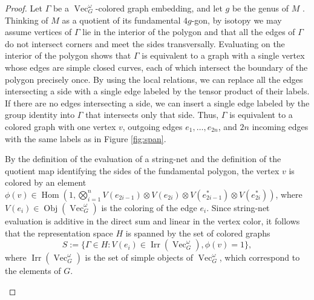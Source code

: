 \documentclass{amsart}
\DeclareMathOperator{\Vect}{Vec}
\DeclareMathOperator{\Hom}{Hom}
\DeclareMathOperator{\Obj}{Obj}
\DeclareMathOperator{\Irr}{Irr}
\begin{document}
\begin{proof}
Let $\Gamma$ be a $\Vect_G^\omega$-colored graph embedding, and let $g$ be the genus of $M$ . Thinking of $M$ as a quotient of its fundamental $4g$-gon, by isotopy we may assume vertices of $\Gamma$ lie in the interior of the polygon and that all the edges of $\Gamma$ do not intersect corners and meet the sides transversally.  Evaluating on the interior of the polygon shows that $\Gamma$ is equivalent to a graph with a single vertex whose edges are simple closed curves, each of which intersect the boundary of the polygon precisely once.  By using the local relations, we can replace all the edges intersecting a side with a single edge labeled by the tensor product of their labels.  If there are no edges intersecting a side, we can insert a single edge labeled by the group identity into $\Gamma$ that intersects only that side.  Thus, $\Gamma$ is equivalent to a colored graph with one vertex $v$, outgoing edges $e_1, \ldots, e_{2n}$, and $2n$ incoming edges with the same labels as in Figure \ref{fig:span}.

By the definition of the evaluation of a string-net and the definition of the quotient map identifying the sides of the fundamental polygon, the vertex $v$ is colored by an element $\phi(v) \in \Hom (1, \bigotimes_{i=1}^n V(e_{2i-1}) \otimes V(e_{2i})  \otimes V(e_{2i-1}^*) \otimes V(e_{2i}^*))$, where $V(e_i) \in \Obj(\Vect_G^\omega)$ is the coloring of the edge $e_i$.  Since string-net evaluation is additive in the direct sum and linear in the vertex color, it follows that the representation space $H$ is spanned by the set of colored graphs
$$ S := \{\Gamma \in H : V(e_i) \in \Irr(\Vect_G^\omega), \phi(v) = 1 \}, $$
where $\Irr(\Vect_G^\omega)$ is the set of simple objects of $\Vect_G^\omega$, which correspond to the elements of $G$. 

\newdimen\R
\R=0.8cm

\begin{figure}

\end{figure}
\end{proof}
\end{document}
